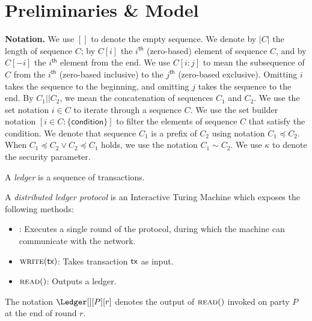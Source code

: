 \section{Preliminaries \& Model}

\noindent
\textbf{Notation.} 
We use $[]$ to denote the empty sequence.
We denote by $|C|$ the length of sequence $C$;
by $C[i]$ the $i^{\textsf{th}}$ (zero-based) element of
sequence $C$, and by $C[-i]$ the $i^{\textsf{th}}$ element
from the end. We use $C[i{:}j]$ to mean the subsequence 
of $C$ from the $i^{\textsf{th}}$ (zero-based inclusive)
to the $j^{\textsf{th}}$ (zero-based exclusive).
Omitting $i$ takes the sequence to the beginning,
and omitting $j$ takes the sequence to the end.
By $C_1 || C_2$, we mean the concatenation
of sequences $C_1$ and $C_2$.
We use the set notation $i \in C$ to iterate
through a sequence $C$.\atnote{[?]}
We use the set builder notation $[i \in C: \{\textsf{condition}\}]$
to filter the elements of sequence $C$ that satisfy the condition. \atnote{[?]}
We denote that sequence $C_1$ is a prefix of $C_2$
using notation $C_1 \preccurlyeq C_2$.
When $C_1 \preccurlyeq C_2 \lor C_2 \preccurlyeq C_1$ holds,
we use the notation $C_1 \sim C_2$.
We use $\kappa$ to denote the security parameter.

\begin{definition}[Ledger]
  A \emph{ledger} is a sequence of transactions.
\end{definition}

\begin{definition}
  A \emph{distributed ledger protocol} is an
  Interactive Turing Machine which exposes the following
  methods:
  \begin{itemize}
    \item \execute: Executes a single round of the protocol, during
      which the machine can communicate with the network.
    \item $\textsc{write}(\textsf{tx})$: Takes transaction $\textsf{tx}$ as input.
    \item $\textsc{read}()$: Outputs a ledger.
  \end{itemize}
\end{definition}

The notation
$\Ledger[][P][r]$ denotes the output of $\textsc{read}()$
invoked on party $P$ at the end of round $r$. 

